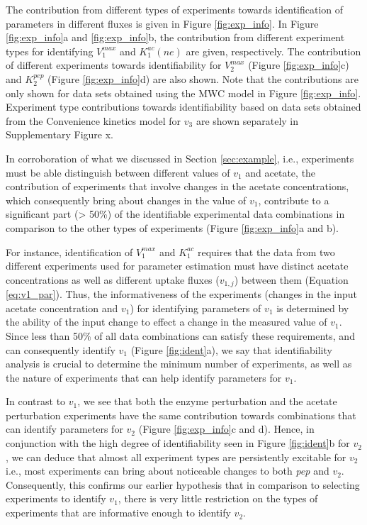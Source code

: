 \documentclass[10pt]{article}
\begin{document}
	The contribution from different types of experiments towards identification of parameters in different fluxes is given in Figure \ref{fig:exp_info}. In Figure \ref{fig:exp_info}a and \ref{fig:exp_info}b, the contribution from different experiment types for identifying $V_1^{max}$ and $K_1^{ac}(ne)$ are given, respectively. The contribution of different experiments towards identifiability for $V_2^{max}$ (Figure \ref{fig:exp_info}c) and $K_2^{pep}$ (Figure \ref{fig:exp_info}d) are also shown. Note that the contributions are only shown for data sets obtained using the MWC model in Figure \ref{fig:exp_info}. Experiment type contributions towards identifiability based on data sets obtained from the Convenience kinetics model for $v_3$ are shown separately in Supplementary Figure x.
	
	In corroboration of what we discussed in Section \ref{sec:example}, i.e., experiments must be able distinguish between different values of $v_1$ and acetate, the contribution of experiments that involve changes in the acetate concentrations, which consequently bring about changes in the value of $v_1$, contribute to a significant part (> 50\%) of the identifiable experimental data combinations in comparison to the other types of experiments (Figure \ref{fig:exp_info}a and b).
	
	For instance, identification of $V_1^{max}$ and $K_1^{ac}$ requires that the data from two different experiments used for parameter estimation must have distinct acetate concentrations as well as different uptake fluxes ($v_{1,j}$) between them (Equation \ref{eq:v1_par}). Thus, the informativeness of the experiments (changes in the input acetate concentration and $v_1$) for identifying parameters of $v_1$ is determined by the ability of the input change to effect a change in the measured value of $v_1$.	Since less than 50\% of all data combinations can satisfy these requirements, and can consequently identify $v_1$ (Figure \ref{fig:ident}a), we say that identifiability analysis is crucial to determine the minimum number of experiments, as well as the nature of experiments that can help identify parameters for $v_1$. 
	
	In contrast to $v_1$, we see that both the enzyme perturbation and the acetate perturbation experiments have the same contribution towards combinations that can identify parameters for $v_2$ (Figure \ref{fig:exp_info}c and d). Hence, in conjunction with the high degree of identifiability seen in Figure \ref{fig:ident}b for $v_2$, we can deduce that almost all experiment types are persistently excitable for $v_2$ i.e., most experiments can bring about noticeable changes to both \textit{pep} and $v_2$. Consequently, this confirms our earlier hypothesis that in comparison to selecting experiments to identify $v_1$, there is very little restriction on the types of experiments that are informative enough to identify $v_2$.
	
\end{document}
